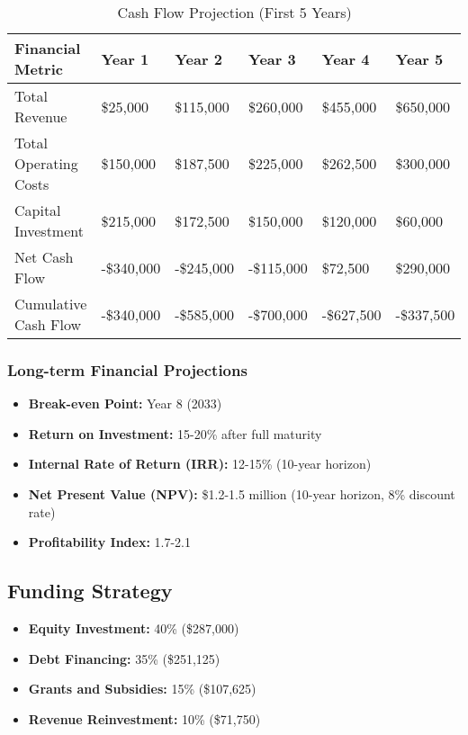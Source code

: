 \begin{table}[h]
\centering
\begin{tabular}{|p{4cm}|p{2cm}|p{2cm}|p{2cm}|p{2cm}|p{2cm}|}
\hline
\textbf{Financial Metric} & \textbf{Year 1} & \textbf{Year 2} & \textbf{Year 3} & \textbf{Year 4} & \textbf{Year 5} \\
\hline
Total Revenue & \$25,000 & \$115,000 & \$260,000 & \$455,000 & \$650,000 \\
Total Operating Costs & \$150,000 & \$187,500 & \$225,000 & \$262,500 & \$300,000 \\
Capital Investment & \$215,000 & \$172,500 & \$150,000 & \$120,000 & \$60,000 \\
\hline
Net Cash Flow & -\$340,000 & -\$245,000 & -\$115,000 & \$72,500 & \$290,000 \\
Cumulative Cash Flow & -\$340,000 & -\$585,000 & -\$700,000 & -\$627,500 & -\$337,500 \\
\hline
\end{tabular}
\caption{Cash Flow Projection (First 5 Years)}
\end{table}

\subsubsection{Long-term Financial Projections}
\begin{itemize}
    \item \textbf{Break-even Point:} Year 8 (2033)
    \item \textbf{Return on Investment:} 15-20\% after full maturity
    \item \textbf{Internal Rate of Return (IRR):} 12-15\% (10-year horizon)
    \item \textbf{Net Present Value (NPV):} \$1.2-1.5 million (10-year horizon, 8\% discount rate)
    \item \textbf{Profitability Index:} 1.7-2.1
\end{itemize}

\subsection{Funding Strategy}
\begin{itemize}
    \item \textbf{Equity Investment:} 40\% (\$287,000)
    \item \textbf{Debt Financing:} 35\% (\$251,125)
    \item \textbf{Grants and Subsidies:} 15\% (\$107,625)
    \item \textbf{Revenue Reinvestment:} 10\% (\$71,750)
\end{itemize}

